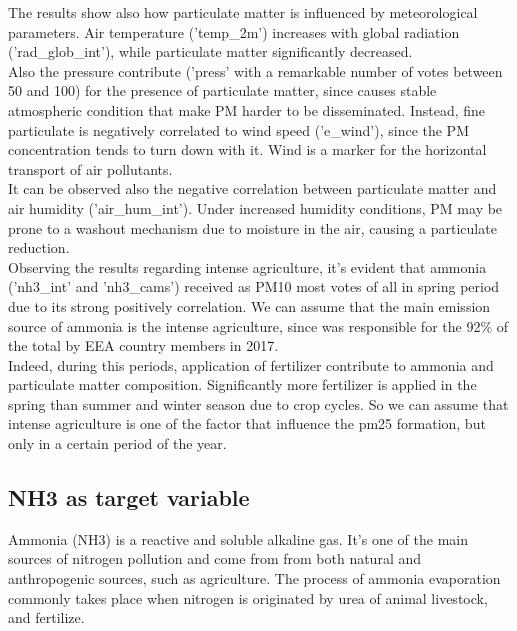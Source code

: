 The results show also how particulate matter is influenced by meteorological parameters.
Air temperature ('temp\_2m') increases with global radiation ('rad\_glob\_int'), while particulate matter significantly decreased\cite{li2015particulate}. \\
Also the pressure contribute ('press' with a remarkable number of votes between 50 and 100) for the presence of particulate matter, since causes stable atmospheric condition that make PM harder to be disseminated. 
Instead, fine particulate is negatively correlated to wind speed ('e\_wind'), since the PM concentration tends to turn down with it. Wind is a marker for the horizontal transport of air pollutants.\\
It can be observed also the negative correlation between particulate matter and air humidity ('air\_hum\_int').
Under increased humidity conditions, PM may be prone to a washout mechanism due to moisture in the air, causing a particulate reduction\cite{biglari2017relationship}.\\
Observing the results regarding intense agriculture, it's evident that ammonia ('nh3\_int' and 'nh3\_cams') received as PM10 most votes of all in spring period due to its strong positively correlation. 
We can assume that the main emission source of ammonia is the intense agriculture, since was responsible for the 92\% of the total by EEA country members in 2017\cite{maranzano2022air}.\\
Indeed, during this periods, application of fertilizer contribute to ammonia and particulate matter composition.
Significantly more fertilizer is applied in the spring than summer and winter season due to crop cycles\cite{goebes2003ammonia}.
So we can assume that intense agriculture is one of the factor that influence the pm25 formation, but only in a certain period of the year.\\

\subsection{NH3 as target variable}
Ammonia (NH3) is a reactive and soluble alkaline gas. It's one of the main sources of nitrogen pollution and come from from both natural and anthropogenic sources, such as agriculture.
The process of ammonia evaporation commonly takes place when nitrogen is originated by urea of animal livestock, and fertilize. \\

